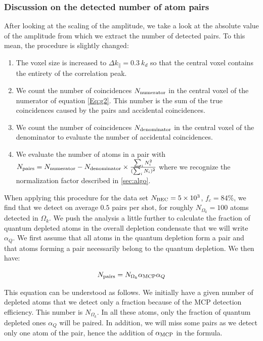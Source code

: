 \subsubsection{Discussion on the detected number of atom pairs}

After looking at the scaling of the amplitude, we take a look at the absolute value of the amplitude from which we extract the number of detected \kmk pairs. To this mean, the procedure is slightly changed:

\begin{enumerate}
    \item The voxel size is increased to $\Delta k_{\parallel} = 0.3 \ k_d$ so that the central voxel contains the entirety of the correlation peak.
    \item We count the number of coincidences $N_{\rm{numerator}}$ in the central voxel of the numerator of equation \ref{Eq:g2}. This number is the sum of the true coincidences caused by the \kmk pairs and accidental coincidences.
    \item  We count the number of coincidences $N_{\rm{denominator}}$ in the central voxel of the denominator to evaluate the number of accidental coincidences.
    \item We evaluate the number of atoms in a \kmk pair with $N_{\rm{pairs}}=N_{\rm{numerator}} - N_{\rm{denominator}} \times \frac{\sum_i N_i^2}{(\sum_i N_i)^2}$ where we recognize the normalization factor described in \ref{sec:algo}.
\end{enumerate}

When applying this procedure for the data set $N_{\rm{BEC}}=5 \times 10^3$, $f_c=84 \%$, we find that we detect on average $0.5$ pairs per shot, for roughly $N_{\Omega_k}=100$ atoms detected in $\Omega_k$. We push the analysis a little further to calculate the fraction of quantum depleted atoms in the overall depletion condensate that we will write $\alpha_Q$. We first assume that all atoms in the quantum depletion form a \kmk pair and that atoms forming a \kmk pair necessarily belong to the quantum depletion. We then have:

\begin{equation}
    N_{\rm{pairs}}= N_{\Omega_k} \alpha_{\rm{MCP}} \alpha_Q
    \label{eq:Npairs}
\end{equation}

This equation can be understood as follows. We initially have a given number of depleted atoms that we detect only a fraction because of the MCP detection efficiency. This number is $N_{\Omega_k}$. In all these atoms, only the fraction of quantum depleted ones $\alpha_Q$ will be \kmk paired. In addition, we will miss some pairs as we detect only one atom of the pair, hence the addition of $\alpha_{\rm{MCP}}$ in the formula.


